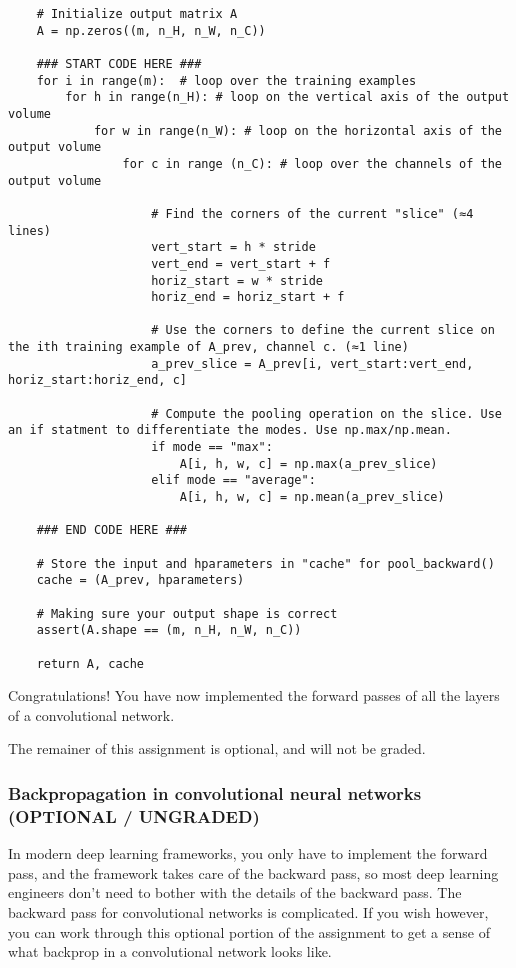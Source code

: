 {\begin{verbatim}
    # Initialize output matrix A
    A = np.zeros((m, n_H, n_W, n_C))              
    
    ### START CODE HERE ###
    for i in range(m):  # loop over the training examples
        for h in range(n_H): # loop on the vertical axis of the output volume
            for w in range(n_W): # loop on the horizontal axis of the output volume
                for c in range (n_C): # loop over the channels of the output volume
                    
                    # Find the corners of the current "slice" (≈4 lines)
                    vert_start = h * stride
                    vert_end = vert_start + f
                    horiz_start = w * stride
                    horiz_end = horiz_start + f
                    
                    # Use the corners to define the current slice on the ith training example of A_prev, channel c. (≈1 line)
                    a_prev_slice = A_prev[i, vert_start:vert_end, horiz_start:horiz_end, c]
                    
                    # Compute the pooling operation on the slice. Use an if statment to differentiate the modes. Use np.max/np.mean.
                    if mode == "max":
                        A[i, h, w, c] = np.max(a_prev_slice)
                    elif mode == "average":
                        A[i, h, w, c] = np.mean(a_prev_slice)
    
    ### END CODE HERE ###
    
    # Store the input and hparameters in "cache" for pool_backward()
    cache = (A_prev, hparameters)
    
    # Making sure your output shape is correct
    assert(A.shape == (m, n_H, n_W, n_C))
    
    return A, cache
\end{verbatim}

Congratulations! You have now implemented the forward passes of all the layers of a convolutional network.

The remainer of this assignment is optional, and will not be graded.



\subsubsection{Backpropagation in convolutional neural networks (OPTIONAL / UNGRADED)}

In modern deep learning frameworks, you only have to implement the forward pass, and the framework takes care of the backward pass, so most deep learning engineers don't need to bother with the details of the backward pass. The backward pass for convolutional networks is complicated. If you wish however, you can work through this optional portion of the assignment to get a sense of what backprop in a convolutional network looks like.

}
